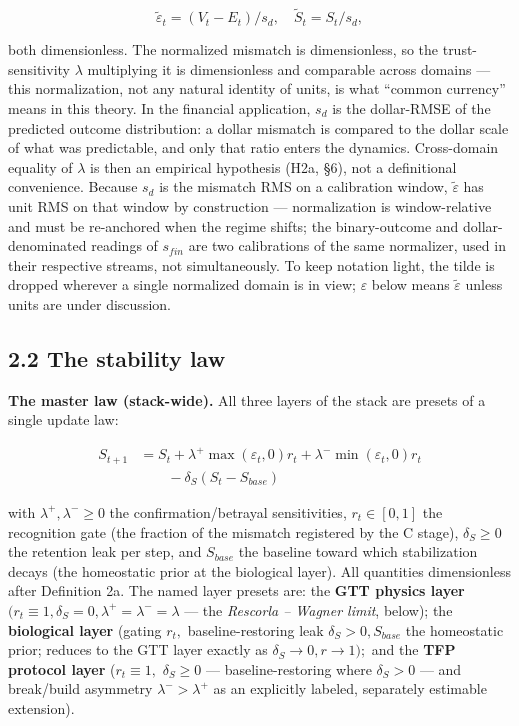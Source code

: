 \documentclass[11pt,twocolumn]{article}
\theoremstyle{gttdef}
\theoremstyle{gttplain}
\begin{document}
\begin{equation}
\tilde{\varepsilon}_t = (V_t - E_t) / s_d, \quad \tilde{S}_t = S_t / s_d,
\label{eq:norm}
\end{equation}

both dimensionless. The normalized mismatch is dimensionless, so the trust-sensitivity $\lambda$ multiplying it is dimensionless and comparable across domains --- this normalization, not any natural identity of units, is what ``common currency'' means in this theory. In the financial application, $s_d$ is the dollar-RMSE of the predicted outcome distribution: a dollar mismatch is compared to the dollar scale of what was predictable, and only that ratio enters the dynamics. Cross-domain equality of $\lambda$ is then an empirical hypothesis (H2a, \S{}6), not a definitional convenience. Because $s_d$ is the mismatch RMS on a calibration window, $\tilde{\varepsilon}$ has unit RMS on that window by construction --- normalization is window-relative and must be re-anchored when the regime shifts; the binary-outcome and dollar-denominated readings of $s_{fin}$ are two calibrations of the same normalizer, used in their respective streams, not simultaneously. To keep notation light, the tilde is dropped wherever a single normalized domain is in view; $\varepsilon$ below means $\tilde{\varepsilon}$ unless units are under discussion.

\subsection*{2.2 The stability law}

\textbf{The master law (stack-wide).} All three layers of the stack are presets of a single update law:

\begin{equation}
\begin{split}
S_{t+1} &= S_t + \lambda^{+} \max(\varepsilon_t, 0) r_t + \lambda^{-} \min(\varepsilon_t, 0) r_t\\
&\qquad - \delta_S (S_t - S_{base})
\end{split}
\label{eq:masterlaw}
\end{equation}

with $\lambda^{+}, \lambda^{-} \geq 0$ the confirmation/betrayal sensitivities, $r_t \in [0, 1]$ the recognition gate (the fraction of the mismatch registered by the C stage), $\delta_S \geq 0$ the retention leak per step, and $S_{base}$ the baseline toward which stabilization decays (the homeostatic prior at the biological layer). All quantities dimensionless after Definition 2a. The named layer presets are: the \textbf{GTT physics layer} $(r_t \equiv 1, \delta_S = 0, \lambda^{+} = \lambda^{-} = \lambda$ --- the \emph{Rescorla -- Wagner limit}, below); the \textbf{biological layer} (gating $r_t,$ baseline-restoring leak $\delta_S > 0, S_{base}$ the homeostatic prior; reduces to the GTT layer exactly as $\delta_S \to 0, r \to 1);$ and the \textbf{TFP protocol layer} ($r_t \equiv 1,$ $\delta_S \geq 0$ --- baseline-restoring where $\delta_S > 0$ --- and break/build asymmetry $\lambda^{-} > \lambda^{+}$ as an explicitly labeled, separately estimable extension).
\end{document}
